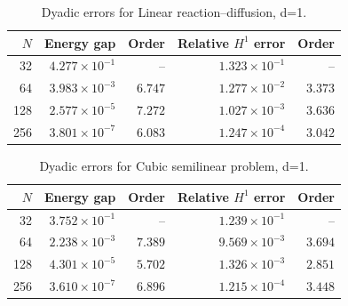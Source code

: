 \begin{table}[!htbp]
\centering\small
\caption{Dyadic errors for Linear reaction--diffusion, d=1.}
\label{tab:dyadic-01}
\begin{tabular}{@{}rrrrr@{}}
\toprule
$N$ & Energy gap & Order & Relative $H^1$ error & Order \\ \midrule
32 & $4.277\!\times\!10^{-1}$ & -- & $1.323\!\times\!10^{-1}$ & -- \\
64 & $3.983\!\times\!10^{-3}$ & $6.747$ & $1.277\!\times\!10^{-2}$ & $3.373$ \\
128 & $2.577\!\times\!10^{-5}$ & $7.272$ & $1.027\!\times\!10^{-3}$ & $3.636$ \\
256 & $3.801\!\times\!10^{-7}$ & $6.083$ & $1.247\!\times\!10^{-4}$ & $3.042$ \\
\bottomrule
\end{tabular}
\end{table}

\begin{table}[!htbp]
\centering\small
\caption{Dyadic errors for Cubic semilinear problem, d=1.}
\label{tab:dyadic-03}
\begin{tabular}{@{}rrrrr@{}}
\toprule
$N$ & Energy gap & Order & Relative $H^1$ error & Order \\ \midrule
32 & $3.752\!\times\!10^{-1}$ & -- & $1.239\!\times\!10^{-1}$ & -- \\
64 & $2.238\!\times\!10^{-3}$ & $7.389$ & $9.569\!\times\!10^{-3}$ & $3.694$ \\
128 & $4.301\!\times\!10^{-5}$ & $5.702$ & $1.326\!\times\!10^{-3}$ & $2.851$ \\
256 & $3.610\!\times\!10^{-7}$ & $6.896$ & $1.215\!\times\!10^{-4}$ & $3.448$ \\
\bottomrule
\end{tabular}
\end{table}

